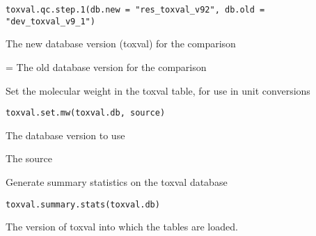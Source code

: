 \documentclass[letterpaper]{book}
\begin{document}
%
\begin{Usage}
\begin{verbatim}
toxval.qc.step.1(db.new = "res_toxval_v92", db.old = "dev_toxval_v9_1")
\end{verbatim}
\end{Usage}
%
\begin{Arguments}
\begin{ldescription}
\item[\code{db.new}] The new database version (toxval) for the comparison

\item[\code{db.old}] = The old database version for the comparison
\end{ldescription}
\end{Arguments}
%
\begin{Description}\relax
Set the molecular weight in the toxval table, for use in unit conversions
\end{Description}
%
\begin{Usage}
\begin{verbatim}
toxval.set.mw(toxval.db, source)
\end{verbatim}
\end{Usage}
%
\begin{Arguments}
\begin{ldescription}
\item[\code{toxval.db}] The database version to use

\item[\code{source}] The source
\end{ldescription}
\end{Arguments}
%
\begin{Description}\relax
Generate summary statistics on the toxval database
\end{Description}
%
\begin{Usage}
\begin{verbatim}
toxval.summary.stats(toxval.db)
\end{verbatim}
\end{Usage}
%
\begin{Arguments}
\begin{ldescription}
\item[\code{toxval.db}] The version of toxval into which the tables are loaded.
\end{ldescription}
\end{Arguments}
\end{document}
